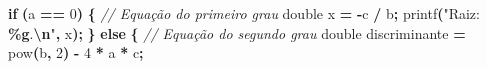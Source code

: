 \documentclass[
  11pt,
  a4paper,
]{scrbook}
\newenvironment{Shaded}{\begin{snugshade}}{\end{snugshade}}
\newcommand{\CommentTok}[1]{\textcolor[rgb]{0.56,0.35,0.01}{\textit{#1}}}
\newcommand{\ControlFlowTok}[1]{\textcolor[rgb]{0.13,0.29,0.53}{\textbf{#1}}}
\newcommand{\DataTypeTok}[1]{\textcolor[rgb]{0.13,0.29,0.53}{#1}}
\newcommand{\DecValTok}[1]{\textcolor[rgb]{0.00,0.00,0.81}{#1}}
\newcommand{\NormalTok}[1]{#1}
\newcommand{\OperatorTok}[1]{\textcolor[rgb]{0.81,0.36,0.00}{\textbf{#1}}}
\newcommand{\SpecialCharTok}[1]{\textcolor[rgb]{0.81,0.36,0.00}{\textbf{#1}}}
\newcommand{\StringTok}[1]{\textcolor[rgb]{0.31,0.60,0.02}{#1}}
\begin{document}
\begin{Shaded}
\begin{Highlighting}[]
    \ControlFlowTok{if} \OperatorTok{(}\NormalTok{a }\OperatorTok{==} \DecValTok{0}\OperatorTok{)} \OperatorTok{\{}
        \CommentTok{// Equação do primeiro grau}
        \DataTypeTok{double}\NormalTok{ x }\OperatorTok{=} \OperatorTok{{-}}\NormalTok{c }\OperatorTok{/}\NormalTok{ b}\OperatorTok{;}  
\NormalTok{        printf}\OperatorTok{(}\StringTok{"Raiz: }\SpecialCharTok{\%g}\StringTok{.}\SpecialCharTok{\textbackslash{}n}\StringTok{"}\OperatorTok{,}\NormalTok{ x}\OperatorTok{);}
    \OperatorTok{\}}
    \ControlFlowTok{else} \OperatorTok{\{}
        \CommentTok{// Equação do segundo grau}
        \DataTypeTok{double}\NormalTok{ discriminante }\OperatorTok{=}\NormalTok{ pow}\OperatorTok{(}\NormalTok{b}\OperatorTok{,} \DecValTok{2}\OperatorTok{)} \OperatorTok{{-}} \DecValTok{4} \OperatorTok{*}\NormalTok{ a }\OperatorTok{*}\NormalTok{ c}\OperatorTok{;}


\end{Highlighting}
\end{Shaded}
\end{document}
